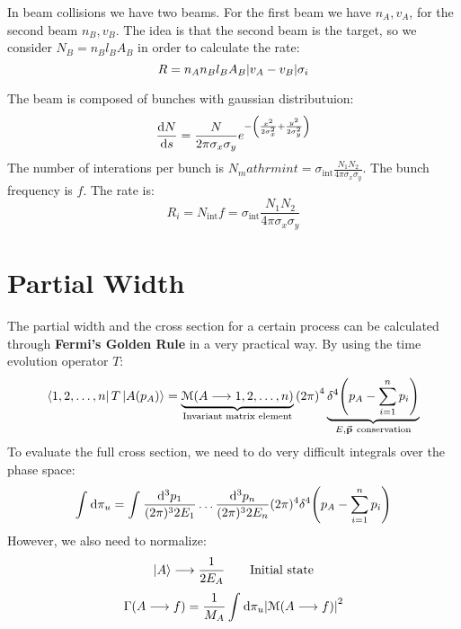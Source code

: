 \documentclass[../../main/main.tex]{subfiles}
\begin{document}
In beam collisions we have two beams. For the first beam we have \( n_A, v_A \), for the second beam \( n_B, v_B \). The idea is that the second beam is the target, so we consider \( N_B = n_B l_B A_B \) in order to calculate the rate:
\begin{equation}
    R = n_A n_B l_B A_B \abs{v_A - v_B} \sigma_i
    \label{eq:}
\end{equation}

The beam is composed of bunches with gaussian distributuion:
\begin{equation}
    \dv{N}{s} = \frac{N}{2\pi \sigma_x \sigma_y} e^{-\qty(\frac{x^2}{2 \sigma_x^2} + \frac{y^2}{2 \sigma_y^2}) }
    \label{eq:}
\end{equation}
The number of interations per bunch is \( N_mathrm{int} = \sigma_\mathrm{int} \frac{N_1 N_2}{4\pi \sigma_x \sigma_y} \). The bunch frequency is \( f \). The rate is:
\begin{equation}
    R_i = N_\mathrm{int} f = \sigma_\mathrm{int} \frac{N_1 N_2}{4\pi \sigma_x \sigma_y}
    \label{eq:}
\end{equation}

\section{Partial Width}
The partial width and the cross section for a certain process can be calculated through \textbf{Fermi's Golden Rule} in a very practical way. By using the time evolution operator \( T \):
\begin{equation}
    \bra{1,2,\dots,n} T \ket{A(p_A)}
    =
    \underbrace{\mathcal{M}(A \longrightarrow 1,2,\dots,n)}_{\text{Invariant matrix element}} \qty(2\pi)^4 \underbrace{\delta^4 \qty(p_A - \sum_{i=1}^{n} p_i )}_{E, \va{p} \ \text{conservation}}
    \label{eq:}
\end{equation}
To evaluate the full cross section, we need to do very difficult integrals over the phase space:
\begin{equation}
    \int_{}^{} \mathrm{d}{\pi_{u}}
    =
    \int_{}^{} \frac{\mathrm{d}{^3 p_1}}{(2\pi)^3 2 E_1} \dots \frac{\mathrm{d}{^3 p_n}}{(2\pi)^3 2 E_n} (2\pi)^4 \delta^4 \qty(p_A - \sum_{i=1}^{n} p_i )
    \label{eq:}
\end{equation}
However, we also need to normalize:
\begin{equation}
    \ket{A} \longrightarrow \frac{1}{2 E_A} \qquad \text{Initial state}
    \label{eq:}
\end{equation}
\begin{equation}
    \Gamma(A \longrightarrow f)
    =
    \frac{1}{M_A} \int_{}^{} \mathrm{d}{\pi_u} \abs{\mathcal{M}(A \longrightarrow f)}^2
    \label{eq:}
\end{equation}
\end{document}
